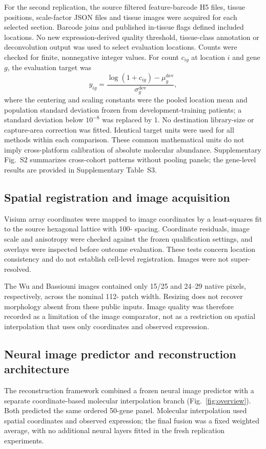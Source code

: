 For the second replication, the source filtered feature-barcode H5 files, tissue positions, scale-factor JSON files and tissue images were acquired for each selected section. Barcode joins and published in-tissue flags defined included locations. No new expression-derived quality threshold, tissue-class annotation or deconvolution output was used to select evaluation locations. Counts were checked for finite, nonnegative integer values. For count $c_{ig}$ at location $i$ and gene $g$, the evaluation target was
\begin{equation}
 y_{ig}=\frac{\log(1+c_{ig})-\mu_g^{\mathrm{dev}}}{\sigma_g^{\mathrm{dev}}},
 \label{eq:target}
\end{equation}
where the centering and scaling constants were the pooled location mean and population standard deviation frozen from development-training patients; a standard deviation below $10^{-8}$ was replaced by 1. No destination library-size or capture-area correction was fitted. Identical target units were used for all methods within each comparison. These common mathematical units do not imply cross-platform calibration of absolute molecular abundance. Supplementary Fig.~S2 summarizes cross-cohort patterns without pooling panels; the gene-level results are provided in Supplementary Table~S3.

\subsection{Spatial registration and image acquisition}
Visium array coordinates were mapped to image coordinates by a least-squares fit to the source hexagonal lattice with 100-\um{} spacing. Coordinate residuals, image scale and anisotropy were checked against the frozen qualification settings, and overlays were inspected before outcome evaluation. These tests concern location consistency and do not establish cell-level registration. Images were not super-resolved.

The Wu and Bassiouni images contained only 15/25 and 24--29 native pixels, respectively, across the nominal 112-\um{} patch width. Resizing does not recover morphology absent from these public inputs. Image quality was therefore recorded as a limitation of the image comparator, not as a restriction on spatial interpolation that uses only coordinates and observed expression.

\subsection{Neural image predictor and reconstruction architecture}
The reconstruction framework combined a frozen neural image predictor with a separate coordinate-based molecular interpolation branch (Fig.~\ref{fig:overview}). Both predicted the same ordered 50-gene panel. Molecular interpolation used spatial coordinates and observed expression; the final fusion was a fixed weighted average, with no additional neural layers fitted in the fresh replication experiments.

